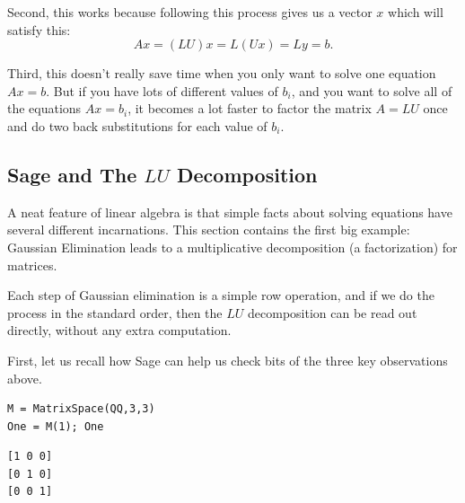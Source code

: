 \documentclass[10pt,]{book}
\theoremstyle{plain}
\numberwithin{equation}{section}
\begin{document}
        Second, this works because following this process gives us a
        vector \(x\) which will satisfy this:
        \[
        Ax = (LU)x = L (Ux) = Ly = b.
        \]
\par

        Third, this doesn't really save time when you only want to solve
        one equation \(Ax= b\). But if you have lots of different values
        of \(b_i\), and you want to solve all of the equations \(Ax = b_i\),
        it becomes a lot faster to factor the matrix \(A= LU\) once and do
        two back substitutions for each value of \(b_i\).
\typeout{************************************************}
\typeout{************************************************}
\subsection[Sage and The \(LU\) Decomposition]{Sage and The \(LU\) Decomposition}\label{subsection-49}

      A neat feature of linear algebra is that simple facts about solving equations
      have several different incarnations. This section contains the first big
      example: Gaussian Elimination leads to a multiplicative decomposition (a
      factorization) for matrices.
\par

      Each step of Gaussian elimination is a simple row operation, and if we do
      the process in the standard order, then the \(LU\) decomposition can
      be read out directly, without any extra computation.
\par

      First, let us recall how Sage can help us check bits of
      the three key observations above.
\begin{lstlisting}[style=sageinput]
M = MatrixSpace(QQ,3,3)
One = M(1); One
\end{lstlisting}
\begin{lstlisting}[style=sageoutput]
[1 0 0]
[0 1 0]
[0 0 1]
\end{lstlisting}
\par
\end{document}
